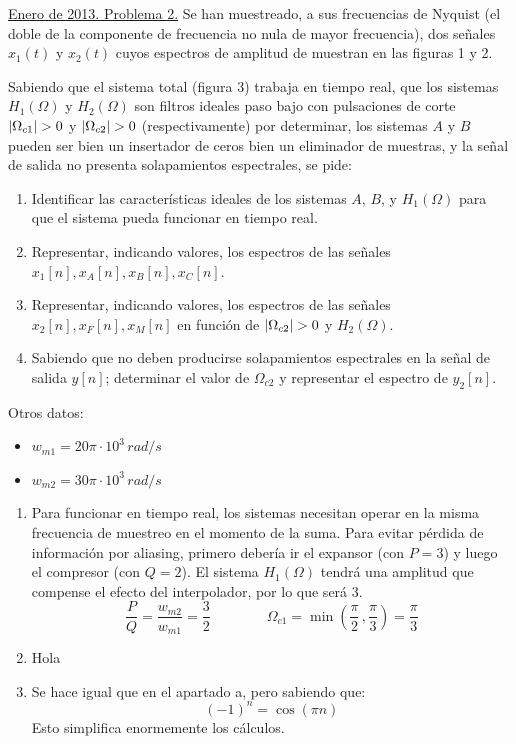 \documentclass[a4paper,oneside]{book}
\begin{document}
\ejemplo
{ %
	\underline{Enero de 2013. Problema 2.} Se han muestreado, a sus frecuencias de Nyquist (el doble de la componente de frecuencia no nula de mayor frecuencia), dos señales $x_1(t)$ y $x_2(t)$ cuyos espectros de amplitud de muestran en las figuras 1 y 2.

	Sabiendo que el sistema total (figura 3) trabaja en tiempo real, que los sistemas $H_1(\Omega)$ y $H_2(\Omega)$ son filtros ideales paso bajo con pulsaciones de corte $\abs{\Omega_{c1}}>0$ y $\abs{\Omega_{c2}}>0$ (respectivamente) por determinar, los sistemas $A$ y $B$ pueden ser bien un insertador de ceros bien un eliminador de muestras, y la señal de salida no presenta solapamientos espectrales, se pide:

	\begin{enumerate}[label=\alph*)]
		 \item Identificar las características ideales de los sistemas $A$, $B$, y $H_1(\Omega)$ para que el sistema pueda funcionar en tiempo real.
		 \item Representar, indicando valores, los espectros de las señales $x_1[n], x_A[n], x_B[n], x_C[n]$.
		 \item Representar, indicando valores, los espectros de las señales $x_2[n], x_F[n], x_M[n]$ en función de $\abs{\Omega_{c2}}>0$ y $H_2(\Omega)$.
		 \item Sabiendo que no deben producirse solapamientos espectrales en la señal de salida $y[n]$; determinar el valor de $\Omega_{c2}$ y representar el espectro de $y_2[n]$.
	\end{enumerate}

	Otros datos:
	\begin{itemize}
		\item $w_{m1} = 20\pi \cdot 10^{3} \, \unit{rad/s}$
		\item $w_{m2} = 30\pi \cdot 10^{3} \, \unit{rad/s}$
	\end{itemize}
}
{ %
	\begin{enumerate}[label=\alph*)]
		 \item Para funcionar en tiempo real, los sistemas necesitan operar en la misma frecuencia de muestreo en el momento de la suma. Para evitar pérdida de información por aliasing, primero debería ir el expansor (con $P=3$) y luego el compresor (con $Q=2$). El sistema $H_1(\Omega)$ tendrá una amplitud que compense el efecto del interpolador, por lo que será $3$. \[ \frac{P}{Q} = \frac{w_{m2}}{w_{m1}} = \frac{3}{2} \qquad \qquad \Omega_{c1} = \min \left( \frac{\pi}{2} \, , \frac{\pi}{3} \right) = \frac{\pi}{3}\]
		 \item Hola
		 \item Se hace igual que en el apartado a, pero sabiendo que: \[ (-1)^n = \cos \left( \pi n \right) \] Esto simplifica enormemente los cálculos.
	\end{enumerate}
}

\end{document}
